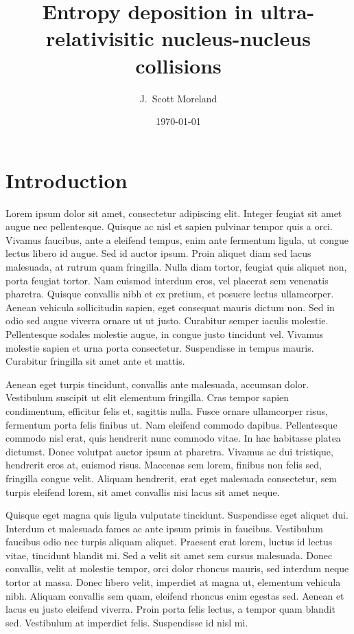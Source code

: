 \documentclass[aps,prc,reprint,amsmath,nofootinbib]{revtex4-1}
\begin{document}
\title{Entropy deposition in ultra-relativisitic nucleus-nucleus collisions}

\author{J.\ Scott Moreland}
\date{\today}

\maketitle

\section{Introduction}


Lorem ipsum dolor sit amet, consectetur adipiscing elit. Integer feugiat sit amet augue nec pellentesque. Quisque ac nisl et sapien pulvinar tempor quis a orci. Vivamus faucibus, ante a eleifend tempus, enim ante fermentum ligula, ut congue lectus libero id augue. Sed id auctor ipsum. Proin aliquet diam sed lacus malesuada, at rutrum quam fringilla. Nulla diam tortor, feugiat quis aliquet non, porta feugiat tortor. Nam euismod interdum eros, vel placerat sem venenatis pharetra. Quisque convallis nibh et ex pretium, et posuere lectus ullamcorper. Aenean vehicula sollicitudin sapien, eget consequat mauris dictum non. Sed in odio sed augue viverra ornare ut ut justo. Curabitur semper iaculis molestie. Pellentesque sodales molestie augue, in congue justo tincidunt vel. Vivamus molestie sapien et urna porta consectetur. Suspendisse in tempus mauris. Curabitur fringilla sit amet ante et mattis.

Aenean eget turpis tincidunt, convallis ante malesuada, accumsan dolor. Vestibulum suscipit ut elit elementum fringilla. Cras tempor sapien condimentum, efficitur felis et, sagittis nulla. Fusce ornare ullamcorper risus, fermentum porta felis finibus ut. Nam eleifend commodo dapibus. Pellentesque commodo nisl erat, quis hendrerit nunc commodo vitae. In hac habitasse platea dictumst. Donec volutpat auctor ipsum at pharetra. Vivamus ac dui tristique, hendrerit eros at, euismod risus. Maecenas sem lorem, finibus non felis sed, fringilla congue velit. Aliquam hendrerit, erat eget malesuada consectetur, sem turpis eleifend lorem, sit amet convallis nisi lacus sit amet neque.

Quisque eget magna quis ligula vulputate tincidunt. Suspendisse eget aliquet dui. Interdum et malesuada fames ac ante ipsum primis in faucibus. Vestibulum faucibus odio nec turpis aliquam aliquet. Praesent erat lorem, luctus id lectus vitae, tincidunt blandit mi. Sed a velit sit amet sem cursus malesuada. Donec convallis, velit at molestie tempor, orci dolor rhoncus mauris, sed interdum neque tortor at massa. Donec libero velit, imperdiet at magna ut, elementum vehicula nibh. Aliquam convallis sem quam, eleifend rhoncus enim egestas sed. Aenean et lacus eu justo eleifend viverra. Proin porta felis lectus, a tempor quam blandit sed. Vestibulum at imperdiet felis. Suspendisse id nisl mi.
\end{document}
